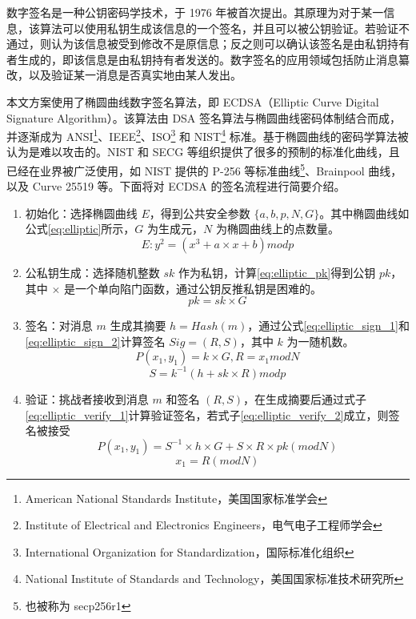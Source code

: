 数字签名是一种公钥密码学技术，于 1976 年被首次提出\cite{1055638}。其原理为对于某一信息，该算法可以使用私钥生成该信息的一个签名，并且可以被公钥验证。若验证不通过，则认为该信息被受到修改不是原信息；反之则可以确认该签名是由私钥持有者生成的，即该信息是由私钥持有者发送的。数字签名的应用领域包括防止消息纂改，以及验证某一消息是否真实地由某人发出。

本文方案使用了椭圆曲线数字签名算法，即 ECDSA（Elliptic Curve Digital Signature Algorithm）。该算法由 DSA 签名算法与椭圆曲线密码体制结合而成，并逐渐成为 ANSI\footnote{American National Standards Institute，美国国家标准学会}、IEEE\footnote{Institute of Electrical and Electronics Engineers，电气电子工程师学会}、ISO\footnote{International Organization for Standardization，国际标准化组织} 和 NIST\footnote{National Institute of Standards and Technology，美国国家标准技术研究所} 标准\cite{ecdsa_blockchain}。基于椭圆曲线的密码学算法被认为是难以攻击的。NIST 和 SECG 等组织提供了很多的预制的标准化曲线，且已经在业界被广泛使用，如 NIST 提供的 P-256 等标准曲线\footnote{也被称为 secp256r1}、Brainpool 曲线，以及 Curve 25519\cite{10.1007/11745853_14} 等。下面将对 ECDSA 的签名流程进行简要介绍。

\begin{enumerate}
    \item 初始化：选择椭圆曲线 $E$，得到公共安全参数 $\{a, b, p, N, G\}$。其中椭圆曲线如公式\eqref{eq:elliptic}所示，$G$ 为生成元，$N$ 为椭圆曲线上的点数量。
    \begin{equation} \label{eq:elliptic} 
        E: y^2 = (x^3 + a \times x + b) mod p
    \end{equation}
    \item 公私钥生成：选择随机整数 $sk$ 作为私钥，计算\eqref{eq:elliptic_pk}得到公钥 $pk$，其中 $\times$ 是一个单向陷门函数，通过公钥反推私钥是困难的。
    \begin{equation} \label{eq:elliptic_pk}
        pk = sk \times G
    \end{equation}
    \item 签名：对消息 $m$ 生成其摘要 $h = Hash(m)$，通过公式\eqref{eq:elliptic_sign_1}和\eqref{eq:elliptic_sign_2}计算签名 $Sig = (R, S)$，其中 $k$ 为一随机数。
    \begin{equation} \label{eq:elliptic_sign_1}
        P(x_1, y_1) = k \times G, R = x_1 mod N
    \end{equation}
    \begin{equation} \label{eq:elliptic_sign_2}
        S = k^{-1} (h + sk \times R) mod p
    \end{equation}
    \item 验证：挑战者接收到消息 $m$ 和签名 $(R, S)$，在生成摘要后通过式子\eqref{eq:elliptic_verify_1}计算验证签名，若式子\eqref{eq:elliptic_verify_2}成立，则签名被接受
    \begin{equation} \label{eq:elliptic_verify_1}
        P(x_1, y_1) = S^{-1} \times h \times G + S \times R \times pk (mod N)
    \end{equation}
    \begin{equation} \label{eq:elliptic_verify_2}
        x_1 = R (mod N)
    \end{equation}
\end{enumerate}

